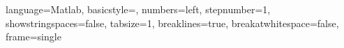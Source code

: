 \usepackage[T1]{fontenc}
\usepackage[utf8]{inputenc}
\usepackage{lmodern}
\usepackage{hyperref}
\usepackage{graphicx}
\usepackage[english]{babel}

\usepackage{bm}
\usepackage{amsmath}
\usepackage{amsfonts}

\usepackage{amsthm}
\newtheorem{definition}{Definizione}
\newtheorem{theorem}{Teorema}
\renewcommand*{\proofname}{Dimostrazione}
\newtheorem{example}{Esempio}
\newtheorem{lemma}{Lemma}
\newtheorem{exercise}{Esercizio}
\newtheorem{property}{Proprietà}

\usepackage[ruled,vlined,linesnumbered]{algorithm2e}

\newcommand{\xstar}{x^*}
\newcommand{\bxstar}{\bm{x^*}}
\newcommand{\bx}{\bm{x}}
\newcommand{\Rn}{\mathbb{R}^n}
\newcommand{\RR}{\mathbb{R}}
\newcommand{\norm}[1]{\left\lvert \left\lvert #1 \right\lvert \right\lvert}

\newcommand{\fx}{f(x)}

\newcommand{\gradfx}{\nabla \fx}
\newcommand{\Gx}{\nabla f(x)}
\newcommand{\Gk}{\nabla f(x_k)}
\newcommand{\Gs}{\nabla f(\xstar)}

\newcommand{\Hx}{\nabla^2 f(x)}
\newcommand{\Hk}{\nabla^2 f(x_k)}
\newcommand{\Hs}{\nabla^2 f(\xstar)}
\newcommand{\hess}{\nabla^2 f}

\newcommand{\step}{\alpha}
\newcommand{\Seqx}{\{ x_k \}}

\usepackage{mathtools}
\newcommand\myeq{\stackrel{\mathclap{\normalfont\mbox{def}}}{=}}

\usepackage{listings}
\lstset
{ 
    language=Matlab,
    basicstyle=\normalsize,
    numbers=left,
    stepnumber=1,
    showstringspaces=false,
    tabsize=1,
    breaklines=true,
    breakatwhitespace=false,
   frame=single
}
